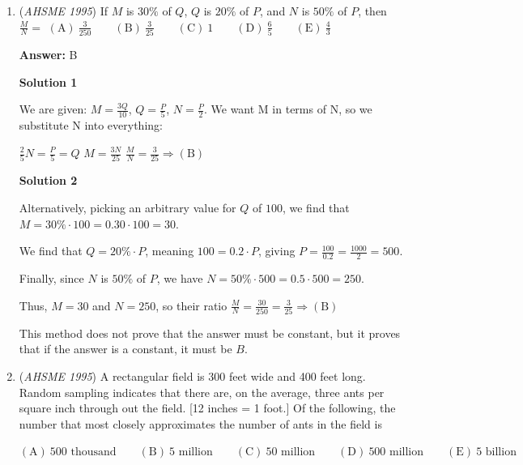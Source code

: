 \begin{enumerate}
 We see that 3 payments of $\textdollar 29.98$ will be a total cost of $3\cdot(30-.02)=90-.06$

 Adding this to $\textdollar9.98$ we have a total of $99.98-.06$

 Clearly, this differs from $\textdollar 99.99$ by $7$ cents. Thus, the answer is $\fbox{\text{(B)}}$



	\item (\textit{AHSME 1995}) If $M$ is $30 \%$ of $Q$, $Q$ is $20 \%$ of $P$, and $N$ is $50 \%$ of $P$, then $\frac {M}{N} =$
$\mathrm{(A) \ \frac {3}{250} } \qquad \mathrm{(B) \ \frac {3}{25} } \qquad \mathrm{(C) \ 1 } \qquad \mathrm{(D) \ \frac {6}{5} } \qquad \mathrm{(E) \ \frac {4}{3} }$

 \textbf{Answer: }B



\textbf{Solution 1}

We are given: $M=\frac{3Q}{10}$, $Q=\frac{P}{5}$, $N=\frac{P}{2}$. We want M in terms of N, so we substitute N into everything:

 $\frac{2}{5}N=\frac{P}{5}=Q$
$M=\frac{3N}{25}$
$\frac{M}{N}=\frac{3}{25} \Rightarrow \mathrm{(B)}$




\textbf{Solution 2}

Alternatively, picking an arbitrary value for $Q$ of $100$, we find that $M = 30\% \cdot 100 = 0.30 \cdot 100 = 30$.

 We find that $Q  = 20\% \cdot P$, meaning $100 = 0.2\cdot P$, giving $P = \frac{100}{0.2} = \frac{1000}{2} = 500$.

 Finally, since $N$ is $50\%$ of $P$, we have $N = 50\% \cdot 500 = 0.5 \cdot 500 = 250$.

 Thus, $M = 30$ and $N = 250$, so their ratio $\frac{M}{N} = \frac{30}{250} = \frac{3}{25} \Rightarrow \mathrm{(B)}$

 This method does not prove that the answer must be constant, but it proves that if the answer is a constant, it must be $B$.

 


	\item (\textit{AHSME 1995}) A rectangular field is 300 feet wide and 400 feet long. Random sampling indicates that there are, on the average, three ants per square inch through out the field. [12 inches = 1 foot.] Of the following, the number that most closely approximates the number of ants in the field is 


 $\mathrm{(A) \ \text{500 thousand} } \qquad \mathrm{(B) \ \text{5 million} } \qquad \mathrm{(C) \ \text{50 million} } \qquad \mathrm{(D) \ \text{500 million} } \qquad \mathrm{(E) \ \text{5 billion} }$


\end{enumerate}
